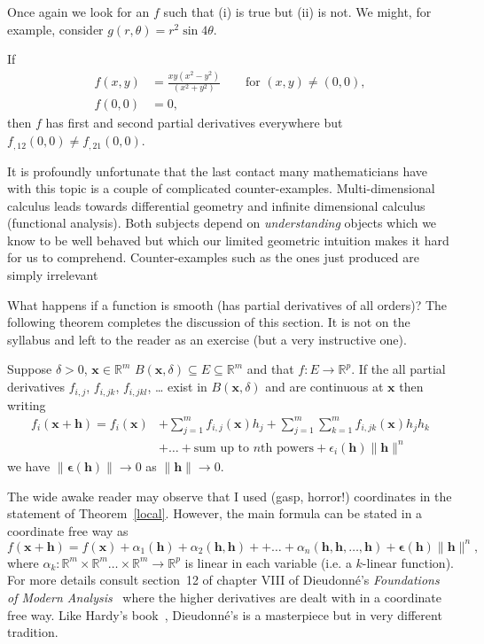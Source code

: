 \noindent Once again
we look for an $f$ such that (i) is true but (ii) is not.
We might, for example, consider
$g(r,\theta)=r^{2}\sin 4\theta$.
\begin{example}\label{symmetry fail} If
\begin{align*}
f(x,y)&=\frac{xy(x^{2}-y^{2})}{(x^{2}+y^{2})}
\qquad\text{for $(x,y)\neq (0,0)$},\\
f(0,0)&=0,
\end{align*}
then $f$ has first and second partial derivatives everywhere
but $f_{,12}(0,0)\neq f_{,21}(0,0)$.
\end{example}     

It is profoundly unfortunate that the last contact
many mathematicians have with this topic is a couple
of complicated counter-examples. Multi-dimensional
calculus leads towards differential geometry and
infinite dimensional calculus (functional analysis).
Both subjects depend on \emph{understanding}
objects which we know to be well behaved but
which our limited geometric intuition makes
it hard for us to comprehend. Counter-examples
such as the ones just produced are simply irrelevant


What happens if a function is smooth (has partial
derivatives of all orders)? The following theorem
completes the discussion of this section. It is not
on the syllabus and left to the reader as an exercise
(but a very instructive one).
\begin{theorem}\label{local}
Suppose $\delta>0$,
${\mathbf x}\in{\mathbb R}^{m}$
$B({\mathbf x},\delta)\subseteq  E\subseteq {\mathbb R}^{m}$
and that $f:E\rightarrow{\mathbb R}^{p}$. If the
all partial
derivatives $f_{i,j}$, $f_{i,jk}$, $f_{i,jkl}$, \dots
exist in $B({\mathbf x},\delta)$
and are continuous at ${\mathbf x}$ then writing
\begin{align*}
f_{i}({\mathbf x}+{\mathbf h})=f_{i}({\mathbf x})&
+\sum_{j=1}^{m}f_{i,j}({\mathbf x})h_{j}+
\sum_{j=1}^{m}\sum_{k=1}^{m}f_{i,jk}({\mathbf x})h_{j}h_{k}\\
&+\dots+\text{sum up to $n$th powers}+
\epsilon_{i}(\mathbf{h})\|\mathbf{h}\|^{n}
\end{align*}
we have $\|{\boldsymbol\epsilon}(\mathbf{h})\|\rightarrow 0$ as
$\|\mathbf{h}\|\rightarrow 0$.
\end{theorem}

The wide awake reader may observe that I used (gasp,
horror!) coordinates in the statement of Theorem~\ref{local}.
However, the main formula
can be stated in a coordinate free way
as
\[
f({\mathbf x}+{\mathbf h})=f({\mathbf x})
+\alpha_{1}({\mathbf h})+\alpha_{2}({\mathbf h},{\mathbf h})+
+\dots+\alpha_{n}({\mathbf h},{\mathbf h},\dots,{\mathbf h})
+{\boldsymbol\epsilon}(\mathbf{h})\|\mathbf{h}\|^{n},
\]
where $\alpha_{k}:{\mathbb R}^{m}\times{\mathbb R}^{m}
\dots\times{\mathbb R}^{m}\rightarrow{\mathbb R}^{p}$
is linear in each variable (i.e. a $k$-linear function).
For more details consult section~12
of chapter VIII of Dieudonn\'{e}'s
\emph{Foundations of Modern Analysis}~\cite{Dieudonn}
where the  higher derivatives are dealt with in a coordinate
free way. Like Hardy's book~\cite{Hardy}, Dieudonn\'{e}'s
is a masterpiece but in very different tradition.


